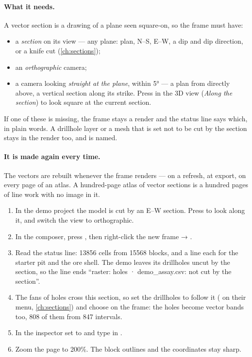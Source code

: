 \paragraph{What it needs.} A vector section is a drawing of a plane seen square-on, so the frame must have:

\begin{itemize}
\item a \emph{section} on its view — any plane: plan, N–S, E–W, a dip and dip direction, or a knife cut (\cref{ch:sections});
\item an \emph{orthographic} camera;
\item a camera looking \emph{straight at the plane}, within 5° — a plan from directly above, a vertical section along its strike. Press  in the 3D view (\emph{Along the section}) to look square at the current section.
\end{itemize}

If one of these is missing, the frame stays a render and the status line says which, in plain words. A drillhole layer or a mesh that is set not to be cut by the section stays in the render too, and is named.

\paragraph{It is made again every time.} The vectors are rebuilt whenever the frame renders — on a refresh, at export, on every page of an atlas. A hundred-page atlas of vector sections is a hundred pages of line work with no image in it.

\begin{tryit}
\begin{enumerate}
\item In the demo project the model is cut by an E–W section. Press  to look along it, and switch the view to orthographic.
\item In the composer, press , then right-click the new frame → .
\item Read the status line: 13856 cells from 15568 blocks, and a line each for the starter pit and the ore shell. The demo leaves its drillholes uncut by the section, so the line ends “raster: holes · demo\_assay.csv: not cut by the section”.
\item The fans of holes cross this section, so set the drillholes to follow it ( on their menu, \cref{ch:sections}) and choose  on the frame: the holes become vector bands too, 808 of them from 847 intervals.
\item In the inspector set  to  and type  in .
\item Zoom the page to 200\%. The block outlines and the coordinates stay sharp.
\end{enumerate}
\end{tryit}

